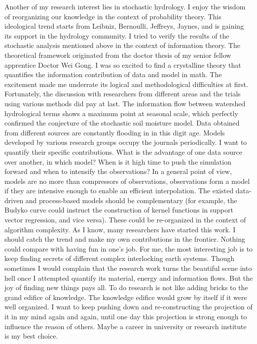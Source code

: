 \documentclass{article}
\begin{document}
{Another of my research interest lies in stochastic hydrology. I enjoy the wisdom of reorganizing our knowledge in the context of probability theory. This ideological trend starts from Leibniz, Bernoulli, Jeffreys, Jaynes, and is gaining its support in the hydrology community. I tried to verify the results of the stochastic analysis mentioned above in the context of information theory. The theoretical framework originated from the doctor thesis of my senior fellow apprentice Doctor Wei Gong. I was so excited to find a crystalline theory that quantifies the information contribution of data and model in math. The excitement made me underrate its logical and methodological difficulties at first. Fortunately, the discussion with researchers from different areas and the trials using various methods did pay at last. The information flow between watershed hydrological terms shows a maximum point at seasonal scale, which perfectly confirmed the conjecture of the stochastic soil moisture model.
Data obtained from different sources are constantly flooding in in this digit age. Models developed by various research groups occupy the journals periodically. I want to quantify their specific contributions. What is the advantage of one data source over another, in which model? When is it high time to push the simulation forward and when to intensify the observations? In a general point of view, models are no more than compressors of observations, observations form a model if they are intensive enough to enable an efficient interpolation. The existed data-driven and process-based models should be complementary (for example, the Budyko curve could instruct the construction of kernel functions in support vector regression, and vice versa). These could be re-organized in the context of algorithm complexity. As I know, many researchers have started this work. I should catch the trend and make my own contributions in the frontier.
Nothing could compare with having fun in one's job. For me, the most interesting job is to keep finding secrets of different complex interlocking earth systems. Though sometimes I would complain that the research work turns the beautiful scene into hell once I attempted quantify its material, energy and information flows. But the joy of finding new things pays all. To do research is not like adding bricks to the grand edifice of knowledge. The knowledge edifice would grow by itself if it were well organized. I want to keep pushing down and re-constructing the projection of it in my mind again and again, until one day this projection is strong enough to influence the reason of others. Maybe a career in university or research institute is my best choice.

}
\end{document}
